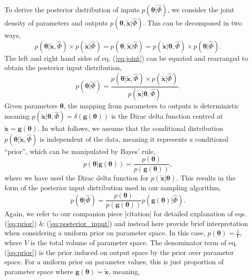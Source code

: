 \documentclass[10pt,letterpaper]{article}
\begin{document}
To derive the posterior distribution of inputs $p(\boldsymbol{\theta}|\hat{\Phi})$, we consider the joint density of parameters and outputs $p(\boldsymbol{\theta},\tilde{\boldsymbol{x}}|\hat{\Phi})$. This can be decomposed in two ways, 
%
\begin{equation}\label{eq:joint}
p(\boldsymbol{\theta}|\tilde{\boldsymbol{x}}, \hat{\Phi}) \times p(\tilde{\boldsymbol{x}}|\hat{\Phi}) = p(\boldsymbol{\theta},\tilde{\boldsymbol{x}}|\hat{\Phi}) =  p(\tilde{\boldsymbol{x}}| \boldsymbol{\theta}, \hat{\Phi}) \times p(\boldsymbol{\theta}|\hat{\Phi}).
\end{equation}
%
The left and right hand sides of eq. (\ref{eq:joint}) can be equated and rearranged to obtain the posterior input distribution,
%
\begin{equation}
p(\boldsymbol{\theta}|\hat{\Phi}) = \frac{p(\boldsymbol{\theta}|\tilde{\boldsymbol{x}}, \hat{\Phi}) \times p(\tilde{\boldsymbol{x}}|\hat{\Phi})}{p(\tilde{\boldsymbol{x}}| \boldsymbol{\theta}, \hat{\Phi})}.
\end{equation}
%
Given parameters $\boldsymbol{\theta}$, the mapping from parameters to outputs is deterministic meaning $p(\tilde{\boldsymbol{x}}| \boldsymbol{\theta}, \hat{\Phi})=\delta(\boldsymbol{g}(\boldsymbol{\theta}))$ is the Dirac delta function centred at $\tilde{\boldsymbol{x}}=\boldsymbol{g}(\boldsymbol{\theta})$. In what follows, we assume that the conditional distribution $p(\boldsymbol{\theta}|\tilde{\boldsymbol{x}}, \hat{\Phi})$ is independent of the data, meaning it represents a conditional ``prior'', which can be manipulated by Bayes' rule,
%
\begin{equation}\label{eq:prior}
p(\boldsymbol{\theta}|\boldsymbol{g}(\boldsymbol{\theta})) = \frac{p(\boldsymbol{\theta})}{p(\boldsymbol{g}(\boldsymbol{\theta}))},
\end{equation}
%
where we have used the Dirac delta function for $p(\tilde{\boldsymbol{x}}|\boldsymbol{\theta})$. This results in the form of the posterior input distribution used in our sampling algorithm,
%
\begin{equation}\label{eq:posterior_input}
p(\boldsymbol{\theta}|\hat{\Phi}) = \frac{p(\boldsymbol{\theta})}{p(\boldsymbol{g}(\boldsymbol{\theta}))} p(\boldsymbol{g}(\boldsymbol{\theta})|\hat{\Phi}).
\end{equation}
%
Again, we refer to our companion piece [citation] for detailed explanation of eqs. (\ref{eq:prior}) \& (\ref{eq:posterior_input}) and instead here provide brief interpretation when considering a uniform prior on parameter space. In this case, $p(\boldsymbol{\theta}) = \frac{1}{V}$, where $V$ is the total volume of parameter space. The denominator term of eq. (\ref{eq:prior}) is the prior induced on output space by the prior over parameter space. For a uniform prior on parameter values, this is just proportion of parameter space where $\boldsymbol{g}(\boldsymbol{\theta}) = \tilde{\boldsymbol{x}}$, meaning,
\end{document}
